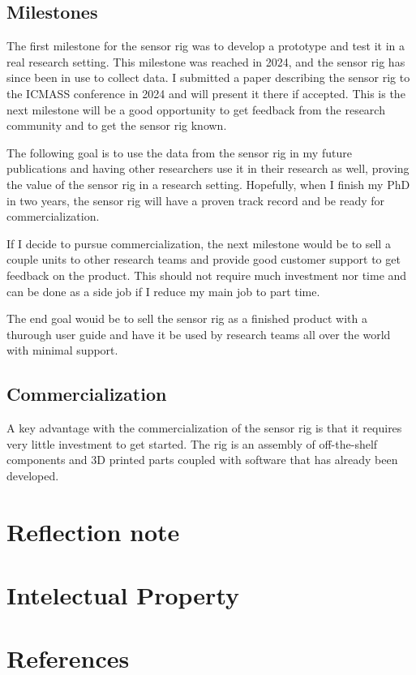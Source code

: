 \documentclass{iopconfser}
\begin{document}
\subsection*{Milestones}
The first milestone for the sensor rig was to develop a prototype and test it in a real research setting.
This milestone was reached in 2024, and the sensor rig has since been in use to collect data.
I submitted a paper describing the sensor rig to the ICMASS conference in 2024 and will present it there if accepted.
This is the next milestone will be a good opportunity to get feedback from the research community and to get the sensor rig known.

The following goal is to use the data from the sensor rig in my future publications and having other researchers use it in their research as well, proving the value of the sensor rig in a research setting.
Hopefully, when I finish my PhD in two years, the sensor rig will have a proven track record and be ready for commercialization.

If I decide to pursue commercialization, the next milestone would be to sell a couple units to other research teams and provide good customer support to get feedback on the product.
This should not require much investment nor time and can be done as a side job if I reduce my main job to part time.

The end goal wouid be to sell the sensor rig as a finished product with a thurough user guide and have it be used by research teams all over the world with minimal support.


\subsection*{Commercialization}
A key advantage with the commercialization of the sensor rig is that it requires very little investment to get started. 
The rig is an assembly of off-the-shelf components and 3D printed parts coupled with software that has already been developed.


\section*{Reflection note}

\section*{Intelectual Property}
\section*{References}
\end{document}
